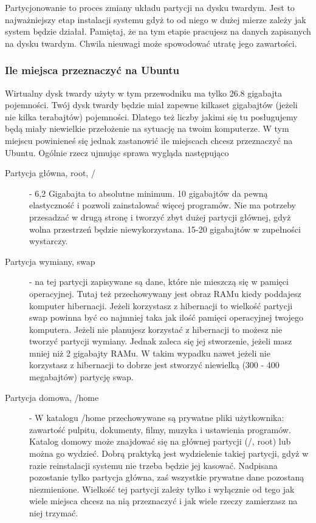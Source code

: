 \label{subsec:partycjonowanie}
Partycjonowanie to proces zmiany układu partycji na dysku twardym. Jest to najważniejszy etap instalacji systemu gdyż to od niego w dużej mierze zależy jak system będzie działał. Pamiętaj, że na tym etapie pracujesz na danych zapisanych na dysku twardym. Chwila nieuwagi może spowodować utratę jego zawartości.
\subsubsection{Ile miejsca przeznaczyć na Ubuntu}
\label{subsubsec:ile_miejsca}
Wirtualny dysk twardy użyty w tym przewodniku ma tylko 26.8 gigabajta pojemności. Twój dysk twardy będzie miał zapewne kilkaset gigabajtów (jeżeli nie kilka terabajtów) pojemności. Dlatego też liczby jakimi się tu posługujemy będą miały niewielkie przełożenie na sytuację na twoim komputerze. W tym miejscu powinieneś się jednak zastanowić ile miejscach chcesz przeznaczyć na Ubuntu.
Ogólnie rzecz ujmując sprawa wygląda następująco
\begin{description}
\item[Partycja główna, root, /] - 6,2 Gigabajta to absolutne minimum. 10 gigabajtów da pewną elastyczność i pozwoli zainstalować więcej programów. Nie ma potrzeby przesadzać w drugą stronę i tworzyć zbyt dużej partycji głównej, gdyż wolna przestrzeń będzie niewykorzystana. 15-20 gigabajtów w zupełności wystarczy.
\item[Partycja wymiany, swap] - na tej partycji zapisywane są dane, które nie mieszczą się w pamięci operacyjnej. Tutaj też przechowywany jest obraz RAMu kiedy poddajesz komputer hibernacji. Jeżeli korzystasz z hibernacji to wielkość partycji swap powinna być co najmniej taka jak ilość pamięci operacyjnej twojego komputera. Jeżeli nie planujesz korzystać z hibernacji to możesz nie tworzyć partycji wymiany. Jednak zaleca się jej stworzenie, jeżeli masz mniej niż 2 gigabajty RAMu. W takim wypadku nawet jeżeli nie korzystasz z hibernacji to dobrze jest stworzyć niewielką (300 - 400 megabajtów) partycję swap.
\item[Partycja domowa, /home] - W katalogu /home przechowywane są prywatne pliki użytkownika: zawartość pulpitu, dokumenty, filmy, muzyka i ustawienia programów. Katalog domowy może znajdować się na głównej partycji (/, root) lub można go wydzieć. Dobrą praktyką jest wydzielenie takiej partycji, gdyż w razie reinstalacji systemu nie trzeba będzie jej kasować. Nadpisana pozostanie tylko partycja główna, zaś wszystkie prywatne dane pozostaną niezmienione. Wielkość tej partycji zależy tylko i wyłącznie od tego jak wiele miejsca chcesz na nią przeznaczyć i jak wiele rzeczy zamierzasz na niej trzymać. 
\end{description}
\clearpage
